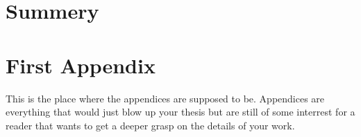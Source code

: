 \documentclass[12pt, a4paper, fleqn]{memoir}%
\begin{document}
\chapter{Summery}
\label{Summery}


{\small}

\appendix
\appendixpage*
\chapter{First Appendix}
\label{app:FirstAppendix}
This is the place where the appendices are supposed to be. Appendices are everything that would just blow up your thesis but are still of some interrest for a reader that wants to get a deeper grasp on the details of your work.

\backmatter
\end{document}
